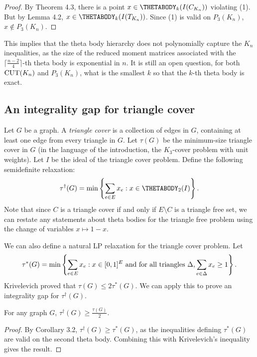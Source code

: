\begin{proof}
By Theorem 4.3, there is a point $x \in \THETABODY_{k}(I(C_{K_n}))$ violating (1). But by Lemma 4.2, $x \in \THETABODY_{k}(I(T_{K_n}))$. Since (1) is valid on $P_3(K_n)$, $x \notin P_3(K_n)$.
\end{proof}

This implies that the theta body hierarchy does not polynomially capture the $K_n$ inequalities, as the size of the reduced moment matrices associated with the $\lceil\frac{n-2}{4}\rceil$-th theta body is exponential in $n$. It is still an open question, for both $\textup{CUT}(K_n)$ and $P_3(K_n)$, what is the
smallest $k$ so that the $k$-th theta body is exact.

\subsection{An integrality gap for triangle cover}
Let $G$ be a graph. A {\it triangle cover} is a collection of edges in $G$, containing at least one edge from every triangle in $G$. Let $\tau(G)$ be the minimum-size triangle cover in $G$ (in the language of the introduction, the $K_3$-cover problem with unit weights). Let $I$ be the ideal of the triangle cover problem. Define the following semidefinite relaxation:
$$\tau^\dagger(G) = \min \left\{\sum_{e \in E} x_e: x \in \THETABODY_2(I) \right\}.$$
Note that since $C$ is a triangle cover if and only if $E \setminus C$ is a triangle free set, we can restate any statements about theta bodies for the triangle free problem using the change of variables $x \mapsto 1-x$.

We can also define a natural LP relaxation for the triangle cover problem. Let
$$\tau^*(G) = \min \left\{\sum_{e \in E} x_e: x \in [0,1]^E \hbox{ and for all triangles $\Delta$,} \sum_{e \in \Delta} x_e \ge 1\right\}.$$
Krivelevich \cite{krivelevich} proved that $\tau(G) \le 2\tau^*(G)$. We can apply this to prove an integrality gap for $\tau^\dagger(G)$.
\begin{theorem}
For any graph $G$, $\tau^\dagger(G) \ge \frac{\tau(G)}{2}$.
\end{theorem}
\begin{proof}
By Corollary 3.2, $\tau^\dagger(G) \ge \tau^*(G)$, as the inequalities defining $\tau^*(G)$ are valid on the second theta body. Combining this with Krivelevich's inequality gives the result.
\end{proof}

